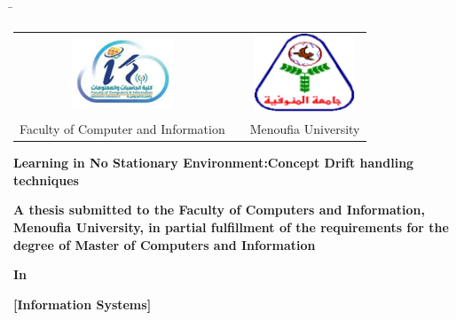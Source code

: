 

\begin{titlepage}
	\begin{tabbing}
		\hspace{1cm} %
		\= \kill %
		\begin{tabular}{ccc} %
			\includegraphics[width=3cm]{0_frontmatter/figures/PNG/faculty_image.png} & \hspace{2.5cm} & \includegraphics[width=3cm]{0_frontmatter/figures/PNG/menoufia_logo.png} \\
			\multicolumn{1}{l}{Faculty of Computer and Information}                  & \hspace{2.5cm} & \multicolumn{1}{l}{Menoufia  University}                                 \\
		\end{tabular}
	\end{tabbing}
	\begin{center}
		\vspace{0.5cm}

		\textbf{\Huge \normalfont Learning in No Stationary Environment:Concept Drift handling techniques}
		\vspace{0.3cm}

		\textbf{\large \normalfont A thesis submitted to the Faculty of Computers and Information, Menoufia University, in partial fulfillment of the requirements for the degree of Master of Computers and Information} \\
		\vspace{0.2cm}

		\textbf{\large In} \\
		\vspace{0.2cm}

		\textbf{\Large [Information Systems]} \\
		\vspace{0.5cm}


\end{center}
\end{titlepage}
